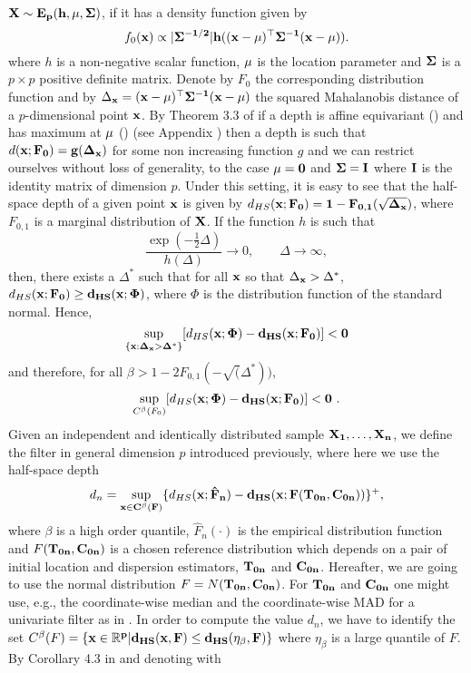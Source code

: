 \documentclass[a4paper,12pt]{article}
\begin{document}
$\bf{X} \sim E_p(h, \bf{\mu}, \bf{\Sigma})$, if it has a density function given by
\begin{equation*}
f_0(\bf{x}) \propto |\bf{\Sigma}^{-1/2}| h((\bf{x}-\bf{\mu})^\top\bf{\Sigma}^{-1}(\bf{x}-\bf{\mu})) .
\end{equation*}
where $h$ is a non-negative scalar function, $\bf{\mu}$ is the location parameter and $\bf{\Sigma}$ is a $p \times p$ positive definite matrix.
Denote by $F_0$ the corresponding distribution function and by $\Delta_{\bf{x}} = (\bf{x} - \bf{\mu})^\top \bf{\Sigma}^{-1} (\bf{x} - \bf{\mu})$ the squared Mahalanobis distance of a $p$-dimensional point $\bf{x}$. By Theorem 3.3 of \citet{Zuo2000b} if a depth is affine equivariant () and has maximum at $\bf{\mu}$ () (see Appendix ) then a depth is such that $d(\bf{x}; F_0) = g(\Delta_{\bf{x}})$ for some non increasing function $g$ and we can restrict ourselves without loss of generality, to the case $\bf{\mu} = \bf{0}$ and $\bf{\Sigma} = \bf{I}$ where $\bf{I}$ is the identity matrix of dimension $p$. Under this setting, it is easy to see that the half-space depth of a given point $\bf{x}$ is given by $d_{HS}(\bf{x}; F_0) = 1 - F_{0,1}(\sqrt{\Delta_{\bf{x}}})$, where $F_{0,1}$ is a marginal distribution of $\bf{X}$.
If the function $h$ is such that
\begin{equation*}
\frac{\exp(-\frac{1}{2} \Delta)}{h(\Delta)} \rightarrow 0 , \qquad \Delta \rightarrow \infty ,
\end{equation*}
then, there exists a $\Delta^\ast$ such that for all $\bf{x}$ so that $\Delta_{\bf{x}} > \Delta^\ast$, $d_{HS}(\bf{x}; F_0) \ge d_{HS}(\bf{x}; \Phi)$, where $\Phi$ is the distribution function of the standard normal. Hence,
\begin{equation*}
\sup_{\{\bf{x}: \Delta_{\bf{x}} > \Delta^\ast\}} [d_{HS}(\bf{x}; \Phi) - d_{HS}(\bf{x}; F_0)] < 0
\end{equation*}
and therefore, for all $\beta > 1 - 2 F_{0,1}(-\sqrt(\Delta^{\ast}))$,  
\begin{equation*}
\sup_{C^\beta(F_0)} [d_{HS}(\bf{x}; \Phi) - d_{HS}(\bf{x}; F_0)] < 0 \ .
\end{equation*}
Given an independent and identically distributed sample $\bf{X}_1, \ldots, \bf{X}_n$, we define the filter in general dimension $p$ introduced previously, where here we use the half-space depth
\begin{equation*}
d_n = \sup_{\bf{x} \in C^\beta(F)} \{ d_{HS}(\bf{x}; \hat{F}_n) - d_{HS}(\bf{x}; F(\bf{T}_{0n}, \bf{C}_{0n})) \}^+ ,
\end{equation*}
where $\beta$ is a high order quantile, $\hat{F}_n(\cdot)$ is the empirical distribution function and $F(\bf{T}_{0n}, \bf{C}_{0n})$ is a chosen reference distribution which depends on a pair of initial location and dispersion estimators, $\bf{T}_{0n}$ and $\bf{C}_{0n}$. Hereafter, we are going to use the normal distribution $F = N(\bf{T}_{0n}, \bf{C}_{0n})$. For $\bf{T}_{0n}$ and $\bf{C}_{0n}$ one might use, e.g., the coordinate-wise median and the coordinate-wise MAD for a univariate filter as in \citet{Zamar2017}. In order to compute the value $d_n$, we have to identify the set $C^\beta(F) = \{ \bf{x} \in \mathbb{R}^p | d_{HS}(\bf{x},F) \le d_{HS}(\eta_\beta,F) \}$ where $\eta_\beta$ is a large quantile of $F$. By Corollary 4.3 in  and denoting with
\end{document}
